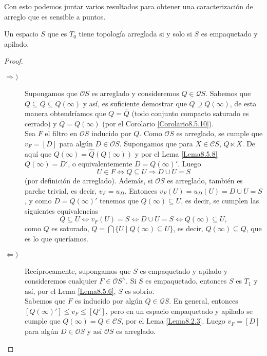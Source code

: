 Con esto podemos juntar varios resultados para obtener una caracterización de arreglo que es sensible a puntos.

\begin{thm}\label{Teorema8.5.12}
    Un espacio $S$ que es $T_0$ tiene topología arreglada si y solo si $S$ es empaquetado y apilado.
\end{thm}

\begin{proof}
    \begin{description}
        \item[$\Rightarrow )$] Supongamos que $\mathcal{O}S$ es arreglado y consideremos $Q\in \mathcal{Q}S$. Sabemos que $Q\subseteq \overline{Q}\subseteq Q(\infty)$ y así, es suficiente demostrar que $Q\supseteq Q(\infty)$, de esta manera obtendríamos que $Q=\overline{Q}$ (todo conjunto compacto saturado es cerrado) y $\overline{Q}=Q(\infty)$ (por el Corolario \ref{Corolario8.5.10}).\\

        Sea $F$ el filtro en $\mathcal{O}S$ inducido por $Q$. Como $\mathcal{O}S$ es arreglado, se cumple que $v_F=[D]$ para algún $D\in \mathcal{O}S$. Supongamos que para $X\in \mathcal{C}S$, $Q\ltimes X$. De aquí que $Q(\infty)=\hat{Q}(Q(\infty))$ y por el Lema \ref{Lema8.5.8} $Q(\infty)=D'$, o equivalentemente $D=Q(\infty)'$. Luego
        \[
        U\in F\Leftrightarrow Q\subseteq U\Rightarrow D\cup U=S 
        \]
        (por definición de arreglado). Además, si $\mathcal{O}S$ es arreglado, también es parche trivial, es decir, $v_F=u_D$. Entonces 
        $v_F(U)=u_D(U)=D\cup U=S$, y como $D=Q(\infty)'$ tenemos que $Q(\infty)\subseteq U$, es decir, se cumplen las siguientes equivalencias
        \[
        Q\subseteq U\Leftrightarrow v_F(U)=S\Leftrightarrow D\cup U=S \Leftrightarrow Q(\infty)\subseteq U,
        \]
        como $Q$ es saturado, $Q=\bigcap\{U\mid Q(\infty)\subseteq U\}$, es decir, $Q(\infty)\subseteq Q$, que es lo que queríamos.

        \item[$\Leftarrow )$]  Recíprocamente, supongamos que $S$ es empaquetado y apilado y consideremos cualquier $F\in \mathcal{O}S^\wedge$. Si $S$ es empaquetado, entonces $S$ es $T_1$ y así, por el Lema \ref{Lema8.5.6}, $S$ es sobrio.\\

        Sabemos que $F$ es inducido por algún $Q\in \mathcal{Q}S$. En general, entonces $[Q(\infty)']\leq v_F\leq [Q']$, pero en un espacio empaquetado y apilado se cumple que $Q(\infty)=Q\in \mathcal{C}S$, por el Lema \ref{Lema8.2.3}. Luego $v_F=[D]$ para algún $D\in \mathcal{O}S$ y así $\mathcal{O}S$ es arreglado.
    \end{description}
\end{proof}

